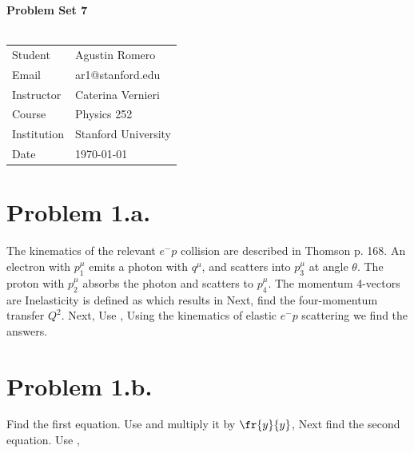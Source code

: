 \documentclass{article}
\begin{document}
\begin{center}
\textbf{\Large{Problem Set 7}}\\~\\
\begin{tabular}{l l}
Student&Agustin Romero\\
Email&ar1@stanford.edu\\
Instructor&Caterina Vernieri\\
Course&Physics 252\\
Institution&Stanford University\\
Date&\today\\
\end{tabular}
\end{center}
\section*{Problem 1.a.}
The kinematics of the relevant $e^{-}p$ collision are described in Thomson p. 168. An electron with $p_1^\mu$ emits a photon with $q^\mu$, and scatters into $p_3^\mu$ at angle $\theta$. The proton with $p_2^\mu$ absorbs the photon and scatters to $p_4^\mu$. The momentum 4-vectors are
Inelasticity is defined as
which results in
Next, find the four-momentum transfer $Q^2$.
Next,
Use ,
Using the kinematics of elastic $e^{-}p$ scattering we find the answers.
\section*{Problem 1.b.}
Find the first equation. Use  and multiply it by $\fr{y}{y}$,
Next find the second equation. Use ,
\end{document}
